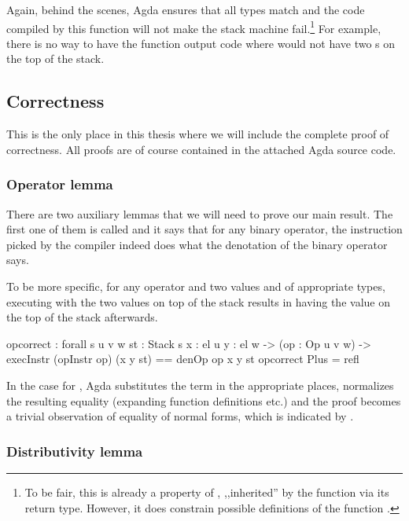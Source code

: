 \noindent Again, behind the scenes, Agda ensures that all types match and the
code compiled by this function will not make the stack machine fail.\footnote{
  To be fair, this is already a property of , ,,inherited'' by the
  function  via its return type.  However, it does constrain
possible definitions of the function .} For example, there is no
way to have the function  output code where  would
not have two s on the top of the stack.

\subsection{Correctness}

This is the only place in this thesis where we will include the complete proof
of correctness. All proofs are of course contained in the attached Agda source
code.

\subsubsection{Operator lemma}

There are two auxiliary lemmas that we will need to prove our main result. The
first one of them is called  and it says that for any binary
operator, the instruction picked by the compiler indeed does what the
denotation of the binary operator says.

To be more specific, for any operator  and two values  and
 of appropriate types, executing  with the two
values on top of the stack results in having the value 
on the top of the stack afterwards.

\label{sec:cor-op-correct}\begin{code}
  op\-correct : forall {s u v w} {st : Stack s} {x : el u} {y : el w}
    -> (op : Op u v w)
    -> execInstr (opInstr op) (x \scons y \scons st) == denOp op x y \scons st
  op\-correct Plus = refl
\end{code}

\noindent In the case for , Agda substitutes the term 
in the appropriate places, normalizes the resulting equality (expanding
function definitions etc.) and the proof becomes a trivial observation of
equality of normal forms, which is indicated by .

\subsubsection{Distributivity lemma}

